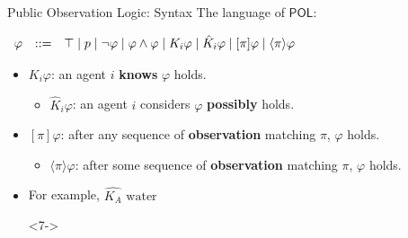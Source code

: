 \documentclass[usenames,dvipsnames]{beamer}
\newcommand\ldiaarg[1]{\langle#1\rangle}
\newcommand{\POL}{\mathsf{POL}}
\newcommand{\union}{\cup}
\newcommand{\ep}{\ensuremath{\varepsilon}}
\newcommand{\obsright}{\blacktriangleright}
\newcommand{\obsleft}{\blacktriangleleft}
\newcommand{\obsup}{\blacktriangle}
\newcommand{\obsdown}{\blacktriangledown}
\newcommand{\expwater}{(\obsright \union \obsup)^* (\obsdown \union \obsleft \union \ep) (\obsright \union \obsup)^*}
\newcommand{\exppower}{(\obsleft \union \obsdown)^* (\obsup \union \obsright \union \ep) (\obsleft \union \obsdown)^*}
\newcommand{\exppatrol}{(\obsright^+ \obsdown^+ \obsleft^+ \obsup^+)^*}
\renewcommand{\phi}{\varphi}
\begin{document}
\begin{frame}{Public Observation Logic: Syntax\footnotemark[1]}
The language of $\POL$:
\vspace{.1cm}
			
		     $\begin{array}{r@{\quad::= \quad}l}
				\phi  &
				\top
				\mid
				p
				\mid \neg \phi
				\mid \phi \land \phi
				\mid K_i\phi
				\mid \hat{K}_i \phi
				\mid [\pi] \phi
				\mid \ldiaarg{\pi} \phi
			\end{array}$
			
			\vspace{.1cm}
    \begin{itemize}
        \item<2-> $K_i\varphi$: an agent $i$ \textbf{knows} $\varphi$ holds.
        \vspace{.1cm}
        \begin{itemize}
            \item<3-> $\hat{K}_i\phi$: an agent $i$ considers $\varphi$ \textbf{possibly} holds.
        \end{itemize}
        \vspace{.1cm}
        \item<4-> $[\pi]\varphi$: after any sequence of \textbf{observation} matching $\pi$, $\varphi$ holds.
        \vspace{.1cm}
        \begin{itemize}
            \item<5-> $\ldiaarg{\pi}\phi$: after some sequence of \textbf{observation} matching $\pi$, $\varphi$ holds.
        \end{itemize}
        \vspace{.1cm}
        \item<6-> For example, $\hat{K_A} \textrm{ water }$
    
    \item[]<7->
    
    \begin{figure}
        \newcommand{\sizefield}{7}
	    

\end{figure}
\end{itemize}
\end{frame}
\end{document}
